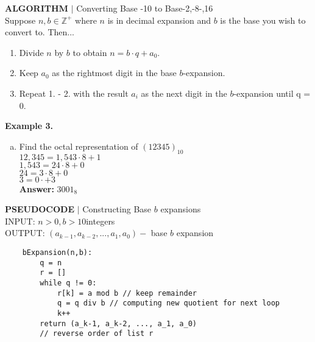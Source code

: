 \documentclass [12pt]{article}
\begin{document}
\begin{framed}
\noindent\textbf{ALGORITHM} $|$ Converting Base -10 to Base-2,-8-,16\\
Suppose $n,b\in\mathbb{Z^+}$ where $n$ is in decimal expansion and $b$ is the base you wish to convert to. Then...
\begin{enumerate}[\quad1.]
    \item Divide $n$ by $b$ to obtain $n = b\cdot q + a_0$.
    \item Keep $a_0$ as the rightmost digit in the base $b$-expansion.
    \item Repeat 1. - 2. with the result $a_i$ as the next digit in the $b$-expansion until q = 0.
\end{enumerate}
\end{framed}
\noindent\textbf{Example 3.}
\begin{enumerate}[(a)]
    \item Find the octal representation of $(12345)_{10}$\\
    \quad $12,345 = 1,543\cdot8 + 1$\\
    \quad $1,543 = 24\cdot8+0$\\
    \quad $24 = 3\cdot8+0$\\
    \quad $3 = 0\cdot+3$\\
    \quad\textbf{Answer:} $3001_8$
\end{enumerate}
\pagebreak

\begin{framed}
\noindent\textbf{PSEUDOCODE} $|$ Constructing Base $b$ expansions\\
INPUT: $n > 0,b>10$integers\\
OUTPUT: $(a_{k-1},a_{k-2},...,a_1,a_0)-$ base $b$ expansion
\begin{lstlisting}
    bExpansion(n,b):
        q = n
        r = []
        while q != 0:
            r[k] = a mod b // keep remainder
            q = q div b // computing new quotient for next loop
            k++
        return (a_k-1, a_k-2, ..., a_1, a_0) 
        // reverse order of list r
\end{lstlisting}
\end{framed}
\vspace{0.25in}
\end{document}
